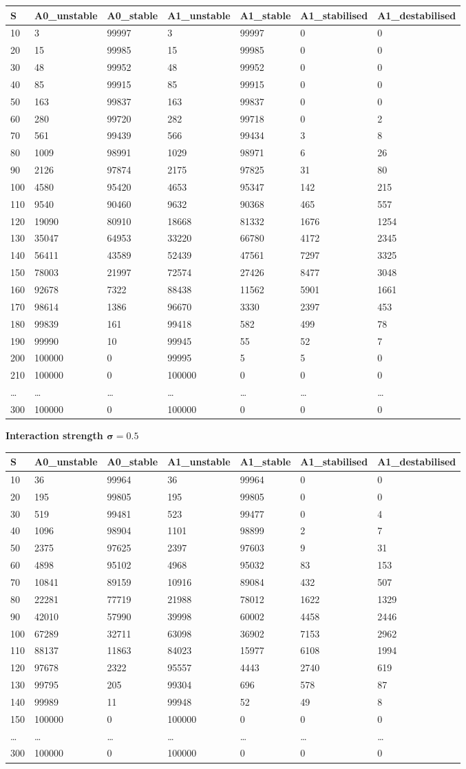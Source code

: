 \documentclass[]{article}
\begin{document}
\begin{longtable}[]{@{}lllllll@{}}
\toprule
S & A0\_unstable & A0\_stable & A1\_unstable & A1\_stable &
A1\_stabilised & A1\_destabilised\tabularnewline
\midrule
\endhead
10 & 3 & 99997 & 3 & 99997 & 0 & 0\tabularnewline
20 & 15 & 99985 & 15 & 99985 & 0 & 0\tabularnewline
30 & 48 & 99952 & 48 & 99952 & 0 & 0\tabularnewline
40 & 85 & 99915 & 85 & 99915 & 0 & 0\tabularnewline
50 & 163 & 99837 & 163 & 99837 & 0 & 0\tabularnewline
60 & 280 & 99720 & 282 & 99718 & 0 & 2\tabularnewline
70 & 561 & 99439 & 566 & 99434 & 3 & 8\tabularnewline
80 & 1009 & 98991 & 1029 & 98971 & 6 & 26\tabularnewline
90 & 2126 & 97874 & 2175 & 97825 & 31 & 80\tabularnewline
100 & 4580 & 95420 & 4653 & 95347 & 142 & 215\tabularnewline
110 & 9540 & 90460 & 9632 & 90368 & 465 & 557\tabularnewline
120 & 19090 & 80910 & 18668 & 81332 & 1676 & 1254\tabularnewline
130 & 35047 & 64953 & 33220 & 66780 & 4172 & 2345\tabularnewline
140 & 56411 & 43589 & 52439 & 47561 & 7297 & 3325\tabularnewline
150 & 78003 & 21997 & 72574 & 27426 & 8477 & 3048\tabularnewline
160 & 92678 & 7322 & 88438 & 11562 & 5901 & 1661\tabularnewline
170 & 98614 & 1386 & 96670 & 3330 & 2397 & 453\tabularnewline
180 & 99839 & 161 & 99418 & 582 & 499 & 78\tabularnewline
190 & 99990 & 10 & 99945 & 55 & 52 & 7\tabularnewline
200 & 100000 & 0 & 99995 & 5 & 5 & 0\tabularnewline
210 & 100000 & 0 & 100000 & 0 & 0 & 0\tabularnewline
\ldots{} & \ldots{} & \ldots{} & \ldots{} & \ldots{} & \ldots{} &
\ldots{}\tabularnewline
300 & 100000 & 0 & 100000 & 0 & 0 & 0\tabularnewline
\bottomrule
\end{longtable}

\textbf{Interaction strength \(\mathbf{\sigma = 0.5}\)}

\begin{longtable}[]{@{}lllllll@{}}
\toprule
S & A0\_unstable & A0\_stable & A1\_unstable & A1\_stable &
A1\_stabilised & A1\_destabilised\tabularnewline
\midrule
\endhead
10 & 36 & 99964 & 36 & 99964 & 0 & 0\tabularnewline
20 & 195 & 99805 & 195 & 99805 & 0 & 0\tabularnewline
30 & 519 & 99481 & 523 & 99477 & 0 & 4\tabularnewline
40 & 1096 & 98904 & 1101 & 98899 & 2 & 7\tabularnewline
50 & 2375 & 97625 & 2397 & 97603 & 9 & 31\tabularnewline
60 & 4898 & 95102 & 4968 & 95032 & 83 & 153\tabularnewline
70 & 10841 & 89159 & 10916 & 89084 & 432 & 507\tabularnewline
80 & 22281 & 77719 & 21988 & 78012 & 1622 & 1329\tabularnewline
90 & 42010 & 57990 & 39998 & 60002 & 4458 & 2446\tabularnewline
100 & 67289 & 32711 & 63098 & 36902 & 7153 & 2962\tabularnewline
110 & 88137 & 11863 & 84023 & 15977 & 6108 & 1994\tabularnewline
120 & 97678 & 2322 & 95557 & 4443 & 2740 & 619\tabularnewline
130 & 99795 & 205 & 99304 & 696 & 578 & 87\tabularnewline
140 & 99989 & 11 & 99948 & 52 & 49 & 8\tabularnewline
150 & 100000 & 0 & 100000 & 0 & 0 & 0\tabularnewline
\ldots{} & \ldots{} & \ldots{} & \ldots{} & \ldots{} & \ldots{} &
\ldots{}\tabularnewline
300 & 100000 & 0 & 100000 & 0 & 0 & 0\tabularnewline
\bottomrule
\end{longtable}
\end{document}
